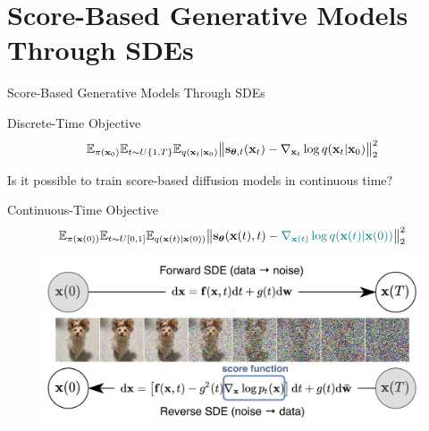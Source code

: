 \documentclass{beamer}
\begin{document}
\section{Score-Based Generative Models Through SDEs}
\begin{frame}{Score-Based Generative Models Through SDEs}
	\begin{block}{Discrete-Time Objective}
		\vspace{-0.3cm}
		\[
			\mathbb{E}_{\pi(\mathbf{x}_0)} \mathbb{E}_{t \sim U\{1, T\}} \mathbb{E}_{q(\mathbf{x}_t | \mathbf{x}_0)}\bigl\| \mathbf{s}_{\boldsymbol{\theta}, t}(\mathbf{x}_t) - \nabla_{\mathbf{x}_t} \log q(\mathbf{x}_t | \mathbf{x}_0) \bigr\|^2_2 
		\]
		\vspace{-0.5cm}
	\end{block}
	Is it possible to train score-based diffusion models in continuous time?
    \eqpause
	\begin{block}{Continuous-Time Objective}
		\vspace{-0.7cm}
		\[
			\mathbb{E}_{\pi(\mathbf{x}(0))} \mathbb{E}_{t \sim U[0, 1]} \mathbb{E}_{q(\mathbf{x}(t) | \mathbf{x}(0))}\bigl\| \mathbf{s}_{\boldsymbol{\theta}}(\mathbf{x}(t), t) - {\color{teal}\nabla_{\mathbf{x}(t)} \log q(\mathbf{x}(t) | \mathbf{x}(0))} \bigr\|^2_2 
		\]
		\vspace{-0.7cm}
	\end{block}
    \eqpause
	\vspace{-0.4cm}
	\begin{figure}
		\includegraphics[width=0.75\linewidth]{figs/sbgm}
	\end{figure}
\end{frame}
\end{document}
